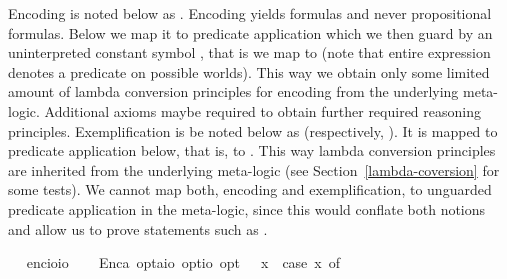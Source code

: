 \begin{isabellebody}
\begin{isamarkuptext}
  Encoding \isa{{\isasymkappa}{\isasymPi}} is noted below as \isa{{\isasymlbrace}{\isasymkappa}{\isacharcomma}{\isasymPi}{\isasymrbrace}}.
  Encoding yields formulas and never propositional formulas. Below we
  map it to predicate application \isa{{\isasymPi}{\isacharparenleft}{\isasymkappa}{\isacharparenright}} which we then guard by an uninterpreted 
  constant symbol , that is we map \isa{{\isasymlbrace}{\isasymkappa}{\isacharcomma}{\isasymPi}{\isasymrbrace}} to  (note that entire 
  expression denotes a predicate on possible worlds). This way we obtain only some limited amount of 
  lambda conversion principles for encoding from the underlying meta-logic. Additional axioms maybe required
  to obtain further required reasoning principles.
  Exemplification is be noted below as  (respectively, ).
  It is mapped to predicate application below, that is, to \isa{{\isasymPi}{\isacharparenleft}{\isasymkappa}{\isacharparenright}}. 
  This way lambda conversion principles are inherited 
  from the underlying meta-logic (see Section~\ref{lambda-coversion} for some tests).
  We cannot map both, encoding and exemplification, to unguarded predicate application in the meta-logic, since this
  would conflate both notions and allow us to prove statements such as .%
\end{isamarkuptext}\isamarkuptrue%
\ \isamarkupfalse%
\ enc{\isacharcolon}{\isacharcolon}{\isachardoublequoteopen}io{\isasymRightarrow}io{\isachardoublequoteclose}\ \isanewline
\isanewline
\ \isamarkupfalse%
\ Enc{\isacharcolon}{\isacharcolon}{\isachardoublequoteopen}{\isacharprime}a\ opt{\isasymRightarrow}{\isacharparenleft}{\isacharprime}a{\isasymRightarrow}io{\isacharparenright}\ opt{\isasymRightarrow}io\ opt{\isachardoublequoteclose}\ {\isacharparenleft}{\isachardoublequoteopen}{\isasymlbrace}{\isacharunderscore}{\isacharcomma}{\isacharunderscore}{\isasymrbrace}{\isachardoublequoteclose}{\isacharparenright}\ \ {\isachardoublequoteopen}{\isasymlbrace}x{\isacharcomma}{\isasymPhi}{\isasymrbrace}\ {\isasymequiv}\ case\ {\isacharparenleft}x{\isacharcomma}{\isasymPhi}{\isacharparenright}\ of\ \isanewline

\end{isabellebody}
